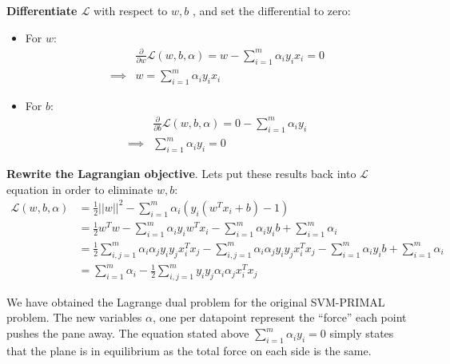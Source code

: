 \documentclass[a4paper]{article}
\begin{document}
\textbf{Differentiate $\mathcal{L}$} with respect to $w, b$ , and set the differential to zero:
	\begin{itemize}
		\item {For $w$: 
		\begin{align}
			&\frac{\partial }{ \partial w}\mathcal{L}(w, b, \alpha) = w - \sum_{i=1}^{m}\alpha_i y_i x_i = 0 \nonumber \\ 
			\implies & w = \sum_{i=1}^{m}\alpha_i y_i x_i 
		\end{align}}
		\item {For $b$:
		\begin{align}
			&\frac{\partial }{\partial b}\mathcal{L}(w, b, \alpha) = 0 - \sum_{i=1}^{m}\alpha_i y_i \nonumber \\
			\implies & \sum_{i=1}^{m}\alpha_i y_i = 0 
		\end{align}}
	\end{itemize}

\textbf{Rewrite the Lagrangian objective}. Lets put these results back into $\mathcal{L}$ equation in order to eliminate $w,b$:
	\begin{align}
		\mathcal{L} (w, b, \alpha) &=  \frac{1}{2} ||w||^2 - \sum_{i=1}^{m}\alpha_i (y_i(w^T x_i +b) - 1) \nonumber \\
		&= \frac{1}{2}w^T w - \sum_{i=1}^{m} \alpha_i y_i w^T x_i - \sum_{i=1}^{m} \alpha_i y_i b + \sum_{i=1}^{m} \alpha_i \nonumber \\
		&= \frac{1}{2} \sum_{i,j=1}^{m}\alpha_i \alpha_j y_i y_j x_i^T x_j - \sum_{i,j=1}^{m}\alpha_i \alpha_j y_i y_j x_i^T x_j - \sum_{i=1}^{m} \alpha_i y_i b + \sum_{i=1}^{m} \alpha_i \nonumber \\
		&=  \sum_{i=1}^{m} \alpha_i - \frac{1}{2} \sum_{i,j=1}^{m} y_i y_j \alpha_i \alpha_j x_i^T x_j
	\end{align}


We have obtained the Lagrange dual problem for the original SVM-PRIMAL problem. The new variables $\alpha$, one per datapoint represent the ``force'' each point pushes  the pane away. The equation stated above $\sum_{i=1}^{m}\alpha_i y_i = 0 $ simply states that the plane is in equilibrium as the total force on each side is the same. 
\end{document}
